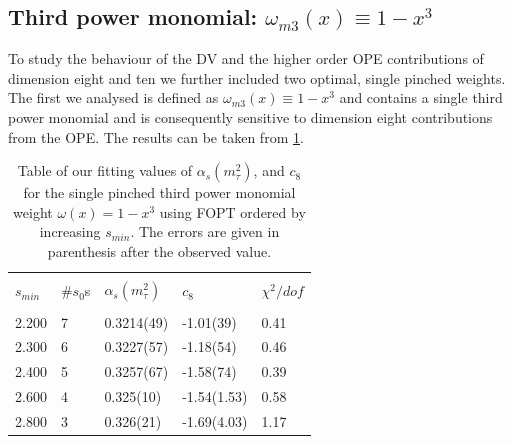 \documentclass[../../index.tex]{subfiles}
\begin{document}
\subsection{Third power monomial: $\omega_{m3}(x) \equiv 1-x^3$}
To study the behaviour of the \textsc{DV} and the higher order \textsc{OPE}
contributions of dimension eight and ten we further included two optimal, single pinched weights.
The first we analysed is defined as $\omega_{m3}(x)\equiv 1-x^3$ and contains a
single third power monomial and is consequently sensitive to dimension eight
contributions from the \textsc{OPE}. The results can be taken from \cref{table:fitWM3AlD8}.
\begin{table}
  \centering
  \begin{tabular}{lllll}
    \toprule \\
    $s_{min}$ & \#$s_0$s & $\alpha_s(m_\tau^2)$ & $c_8$ &  $\chi^2/dof$  \\
    \hline \\
    2.200 & 7  & 0.3214(49) & -1.01(39) & 0.41 \\
    2.300 & 6  & 0.3227(57) & -1.18(54) & 0.46 \\
    2.400 & 5  & 0.3257(67) & -1.58(74) & 0.39 \\
    2.600 & 4  & 0.325(10) & -1.54(1.53) & 0.58 \\
    2.800 & 3  & 0.326(21) & -1.69(4.03) & 1.17 \\
    \bottomrule
  \end{tabular}
  \caption{Table of our fitting values of $\alpha_s(m_\tau^2)$, and
    $c_{8}$ for the single pinched third power monomial weight $\omega(x)=1-x^3$ using FOPT ordered
    by increasing $s_{min}$. The errors are given in parenthesis after the observed value.}
  \label{table:fitWM3AlD8}
\end{table}
\end{document}
